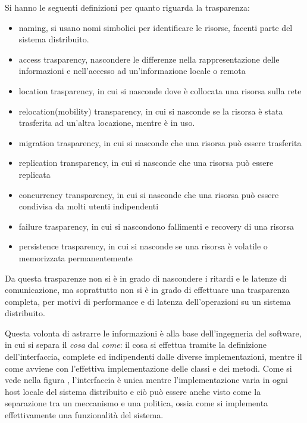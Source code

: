 \message{ !name(sd.tex)}\documentclass[a4paper,12pt, oneside]{book}
\begin{document}
Si hanno le seguenti definizioni per quanto riguarda la trasparenza:
\begin{itemize}
    \item naming, si usano nomi simbolici per identificare le risorse,
            facenti parte del sistema distribuito.
    \item access trasparency, nascondere le differenze nella rappresentazione 
        delle informazioni e nell'accesso ad un'informazione locale o remota 
    \item location trasparency, in cui si nasconde dove è collocata una risorsa sulla rete
    \item  relocation(mobility) transparency, in cui si nasconde se la risorsa è stata
        trasferita ad un'altra locazione, mentre è in uso.
    \item migration trasparency, in cui si nasconde che una risorsa può essere trasferita
    \item replication transparency, in cui si nasconde che una risorsa può essere replicata
    \item concurrency transparency, in cui si nasconde che una risorsa può essere condivisa
        da molti utenti indipendenti
    \item failure trasparency, in cui si nascondono fallimenti e recovery di una risorsa
    \item persistence trasparency, in cui si nasconde se una risorsa
                  è volatile o memorizzata permanentemente
\end{itemize}
Da questa trasparenze non si è in grado di nascondere i ritardi e le latenze di comunicazione, ma
soprattutto non si è in grado di effettuare una trasparenza completa, per motivi di performance
e di latenza dell'operazioni su un sistema distribuito.

Questa volonta di astrarre le informazioni è alla base dell'ingegneria del software, in cui si separa
il \textit{cosa} dal \textit{come}: il cosa si effettua tramite la definizione dell'interfaccia, complete
ed indipendenti dalle diverse implementazioni, mentre il come avviene con l'effettiva implementazione
delle classi e dei metodi.\newline
Come si vede nella figura \href{figura:interfaccia}, l'interfaccia è unica mentre l'implementazione
varia in ogni host locale del sistema distribuito e ciò può essere anche visto come la separazione
tra un meccanismo e una politica, ossia come si implementa effettivamente una funzionalità del sistema.
\end{document}
